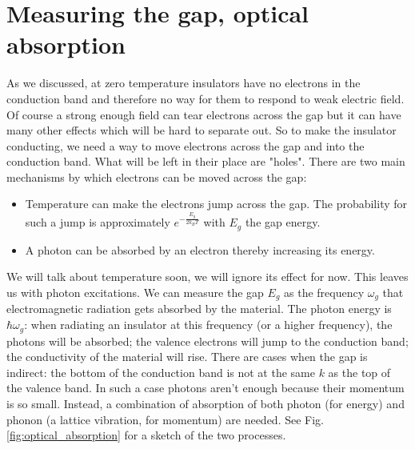 \documentclass{Textbook}
\begin{document}
\section{Measuring the gap, optical absorption}
As we discussed, at zero temperature insulators have no electrons in the conduction band and therefore no way for them to respond to weak electric field. Of course a strong enough field can tear electrons across the gap but it can have many other effects which will be hard to separate out. So to make the insulator conducting, we need a way to move electrons across the gap and into the conduction band. What will be left in their place are "holes". There are two main mechanisms by which electrons can be moved across the gap:
\begin{itemize}
\item Temperature can make the electrons jump across the gap. The probability for such a jump is approximately $e^{-\frac{E_g}{2k_BT}}$ with $E_g$ the gap energy.
\item A photon can be absorbed by an electron thereby increasing its energy.
\end{itemize} 
We will talk about temperature soon, we will ignore its effect for now. This leaves us with photon excitations.\nl
We can measure the gap $E_g$ as the frequency $\omega_g$ that electromagnetic radiation gets absorbed by the material. The photon energy is $\hbar\omega_g$: when radiating an insulator at this frequency (or a higher frequency), the photons will be absorbed; the valence electrons will jump to the conduction band; the conductivity of the material will rise. \nl
There are cases when the gap is indirect: the bottom of the conduction band is not at the same $k$ as the top of the valence band. In such a case photons aren't enough because their momentum is so small. Instead, a combination of absorption of both photon (for energy) and phonon (a lattice vibration, for momentum) are needed. See Fig. \ref{fig:optical_absorption} for a sketch of the two processes. 
\end{document}
